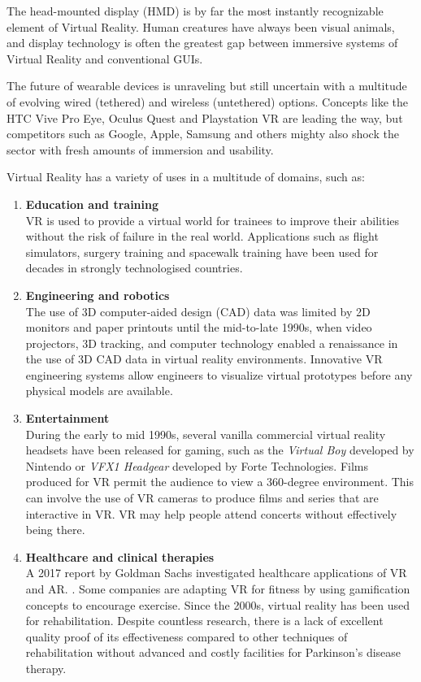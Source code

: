 \documentclass[12pt,a4paper,twoside]{report}
\begin{document}
The head-mounted display (HMD) is by far the most instantly recognizable element of Virtual Reality. Human creatures have always been visual animals, and display technology is often the greatest gap between immersive systems of Virtual Reality and conventional GUIs.

The future of wearable devices is unraveling but still uncertain with a multitude of evolving wired (tethered) and wireless (untethered) options. Concepts like the HTC Vive Pro Eye, Oculus Quest and Playstation VR are leading the way, but competitors such as Google, Apple, Samsung and others mighty also shock the sector with fresh amounts of immersion and usability.

Virtual Reality has a variety of uses in a multitude of domains, such as:

\begin{enumerate}
  \item \textbf{Education and training} \\
    VR is used to provide a virtual world for trainees to improve their abilities without the risk of failure in the real world. Applications such as flight simulators, surgery training and spacewalk training have been used for decades in strongly technologised countries.

  \item \textbf{Engineering and robotics} \\
    The use of 3D computer-aided design (CAD) data was limited by 2D monitors and paper printouts until the mid-to-late 1990s, when video projectors, 3D tracking, and computer technology enabled a renaissance in the use of 3D CAD data in virtual reality environments. Innovative VR engineering systems allow engineers to visualize virtual prototypes before any physical models are available.

  \item \textbf{Entertainment} \\
    During the early to mid 1990s, several vanilla commercial virtual reality headsets have been released for gaming, such as the \textit{Virtual Boy} developed by Nintendo or \textit{VFX1 Headgear} developed by Forte Technologies. Films produced for VR permit the audience to view a 360-degree environment. This can involve the use of VR cameras to produce films and series that are interactive in VR. VR may help people attend concerts without effectively being there.

  \item \textbf{Healthcare and clinical therapies} \\
    A 2017 report by Goldman Sachs investigated healthcare applications of VR and AR. \cite{VRAR}. Some companies are adapting VR for fitness by using gamification concepts to encourage exercise. Since the 2000s, virtual reality has been used for rehabilitation. Despite countless research, there is a lack of excellent quality proof of its effectiveness compared to other techniques of rehabilitation without advanced and costly facilities for Parkinson's disease therapy. \cite{Parkinsons}


\end{enumerate}
\end{document}
